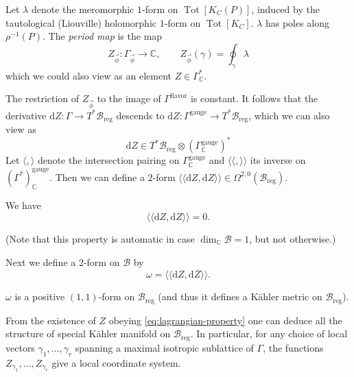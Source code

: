 \documentclass[12pt,letterpaper,reqno]{article}
\numberwithin{equation}{section}
\newcommand{\cB}{\ensuremath{\mathcal B}}
\newcommand{\C}{\ensuremath{\mathbb C}}
\newcommand{\Z}{\ensuremath{\mathbb Z}}
\newcommand{\kahler}{K\"ahler\xspace}
\newcommand{\de}{\mathrm{d}}
\newcommand{\reg}{\mathrm{reg}}
\newcommand{\gauge}{\mathrm{gauge}}
\newcommand{\flavor}{\mathrm{flavor}}
\newcommand{\IP}[1]{\langle#1\rangle}
\newcommand{\DIP}[1]{\langle\!\langle#1\rangle\!\rangle}
\newcommand{\vphi}{{\vec\phi}}
\newcommand{\ti}[1]{\textit{#1}}
\DeclareMathOperator{\rank}{rank}
\DeclareMathOperator{\Tot}{Tot}
\newcommand{\Sp}{\mathrm{Sp}}
\begin{document}
\begin{defn}
Let $\lambda$ denote the meromorphic $1$-form on $\Tot[K_C(P)]$,
induced by the tautological (Liouville) holomorphic $1$-form
on $\Tot[K_C]$.
$\lambda$ has poles along $\rho^{-1}(P)$.
The \ti{period map} is the map
\begin{equation}
   Z_\vphi: \Gamma_\vphi \to \C, \qquad Z_\vphi(\gamma) = \oint_\gamma \lambda
\end{equation}
which we could also view as an element $Z \in \Gamma^*_\C$.
\end{defn}
The restriction of $Z_\vphi$ to the image of $\Gamma^\flavor$ is constant. 
It follows that the derivative $\de Z: \Gamma \to T^* \cB_\reg$ descends to
$\de Z: \Gamma^\gauge \to T^* \cB_\reg$,
which we can also view as
\begin{equation}
  \de Z \in T^* \cB_\reg \otimes (\Gamma_\C^\gauge)^*
\end{equation}
Let $\IP{,}$ denote the intersection pairing on $\Gamma_\C^\gauge$
and $\DIP{,}$ its inverse on $(\Gamma^*)^\gauge_\C$.
Then we can define a $2$-form
 $\DIP{\de Z,  \de Z} \in \Omega^{2,0}(\cB_\reg)$.

\begin{prop} We have
\begin{equation}  \label{eq:lagrangian-property}
\DIP{\de Z, \de Z} = 0.
\end{equation}
\end{prop}

(Note that this property is automatic in case
$\dim_\C \cB = 1$, but not otherwise.)

Next we define a 2-form on $\cB$ by
\begin{equation}
  \omega = \DIP{\de Z, \de \overline{Z}}.
\end{equation}

\begin{prop} $\omega$ is a
positive $(1,1)$-form on $\cB_\reg$ (and thus it defines
a \kahler metric on $\cB_\reg$).
\end{prop}

From the existence of $Z$ obeying \eqref{eq:lagrangian-property}
one can deduce all the structure
of special \kahler manifold on $\cB_\reg$. In particular,
for any choice of local vectors $\gamma_1, \dots, \gamma_r$
spanning a maximal isotropic sublattice of $\Gamma$, the functions
$Z_{\gamma_1}, \dots, Z_{\gamma_r}$ give a local coordinate
system.
\end{document}
